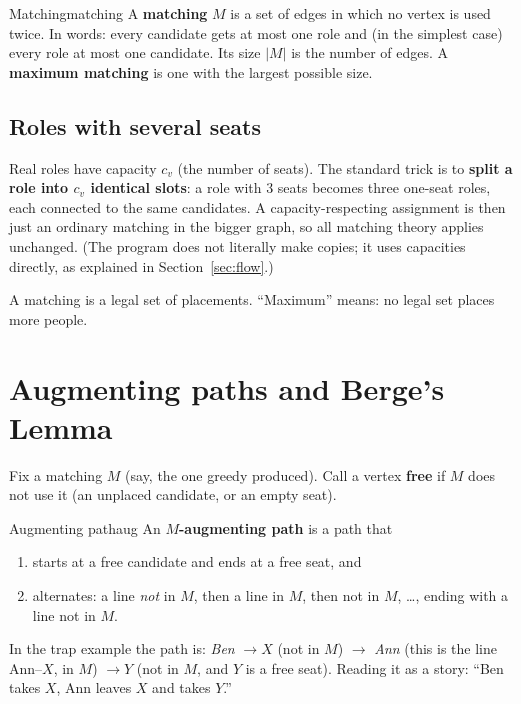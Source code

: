 \documentclass[11pt]{article}
\begin{document}
\begin{definition}{Matching}{matching}
A \textbf{matching} $M$ is a set of edges in which no vertex is used twice. In words: every candidate gets at most one role and (in the simplest case) every role at most one candidate. Its size $|M|$ is the number of edges. A \textbf{maximum matching} is one with the largest possible size.
\end{definition}

\subsection{Roles with several seats}

Real roles have capacity $c_v$ (the number of seats). The standard trick is to \textbf{split a role into $c_v$ identical slots}: a role with 3 seats becomes three one-seat roles, each connected to the same candidates. A capacity-respecting assignment is then just an ordinary matching in the bigger graph, so all matching theory applies unchanged. (The program does not literally make copies; it uses capacities directly, as explained in Section~\ref{sec:flow}.)

\begin{plain}
A matching is a legal set of placements. ``Maximum'' means: no legal set places more people.
\end{plain}

\section{Augmenting paths and Berge's Lemma}\label{sec:berge}

Fix a matching $M$ (say, the one greedy produced). Call a vertex \textbf{free} if $M$ does not use it (an unplaced candidate, or an empty seat).

\begin{definition}{Augmenting path}{aug}
An \textbf{$M$-augmenting path} is a path that
\begin{enumerate}[nosep]
 \item starts at a free candidate and ends at a free seat, and
 \item alternates: a line \emph{not} in $M$, then a line in $M$, then not in $M$, \dots, ending with a line not in $M$.
\end{enumerate}
\end{definition}

In the trap example the path is: \emph{Ben} $\to X$ (not in $M$) $\to$ \emph{Ann} (this is the line Ann--$X$, in $M$) $\to Y$ (not in $M$, and $Y$ is a free seat). Reading it as a story: ``Ben takes $X$, Ann leaves $X$ and takes $Y$.''
\end{document}
